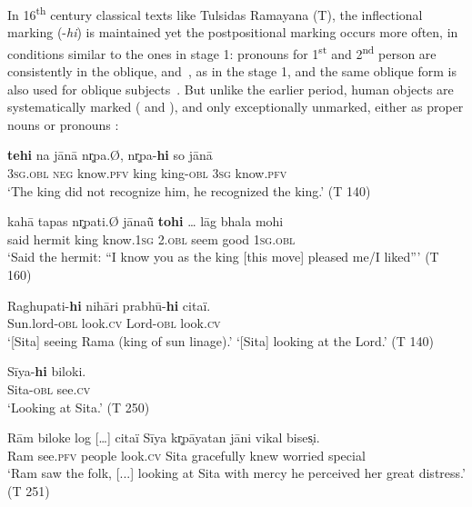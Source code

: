 \documentclass[output=paper]{LSP/langsci}
\begin{document}
In 16\textsuperscript{th} century classical texts like Tulsidas Ramayana (T), the inflectional marking (-\textit{hi}) is maintained yet the postpositional marking occurs more often, in conditions similar to the ones in stage 1: pronouns for 1\textsuperscript{st} and 2\textsuperscript{nd} person are consistently in the oblique,  and~, as in the stage 1, and the same oblique form is also used for oblique subjects~. But unlike the earlier period, human objects are systematically marked ( and ), and only exceptionally unmarked, either as proper nouns or pronouns :

\ea
\label{10-mo-ex:34}
\gll \textbf{tehi} na jānā nr̥pa.Ø, nr̥pa-\textbf{hi} so jānā\\
\textsc{3sg.obl} \textsc{neg} know.\textsc{pfv} king king-\textsc{obl} \textsc{3sg} know.\textsc{pfv}\\
\glt ‘The king did not recognize him, he recognized the king.’ (T 140)
\z

\ea
\label{10-mo-ex:35}
\gll  kahā tapas nr̥pati.Ø jānaū̃ \textbf{tohi} … lāg bhala mohi\\
 said hermit king know.\textsc{1sg} \textsc{2.obl} {}  seem good \textsc{1sg.obl}\\
\glt ‘Said the hermit: “I know you as the king [this move] pleased me/I liked”’ (T 160)
\z

\ea\label{10-mo-ex:36}

\ea \label{10-mo-ex:36a}
\gll Raghupati-\textbf{hi} nihāri prabhū-\textbf{hi} citaï.\\
 Sun.lord-\textsc{obl} look.\textsc{cv} Lord-\textsc{obl} look.\textsc{cv}\\
\glt ‘[Sita] seeing Rama (king of sun linage).’ ‘[Sita] looking at the Lord.’ (T 140)

\ex \label{10-mo-ex:36b}
\gll Sīya-\textbf{hi} biloki.\\
 Sita-\textsc{obl} see.\textsc{cv}\\
\glt  [Ram] ‘Looking at Sita.’ (T 250)
 \z
 \z
 
\ea
\label{10-mo-ex:37}

\ea \label{10-mo-ex:37a}
\gll Rām biloke log […] citaï Sīya kr̥pāyatan jāni vikal bises̩i.\\
 Ram see.\textsc{pfv} people { } look.\textsc{cv} Sita gracefully knew worried special\\
\glt ‘Ram saw the folk, [...] looking at Sita with mercy he perceived her great distress.’ (T 251)
\end{document}
